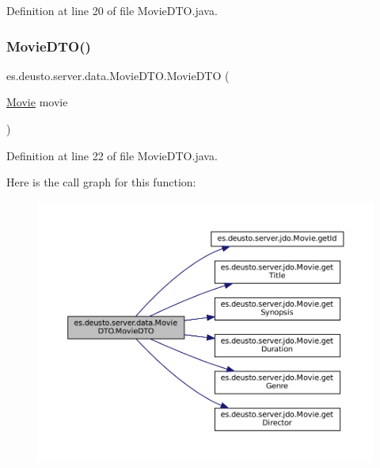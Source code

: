 Definition at line 20 of file Movie\+D\+T\+O.\+java.

\mbox{\label{classes_1_1deusto_1_1server_1_1data_1_1_movie_d_t_o_ad09b9cd627c8906f7ab7fe86d09b9e75}} 
\subsubsection{\texorpdfstring{MovieDTO()}{MovieDTO()}\hspace{0.1cm}{\footnotesize\ttfamily [2/2]}}
{\footnotesize\ttfamily es.\+deusto.\+server.\+data.\+Movie\+D\+T\+O.\+Movie\+D\+TO (\begin{DoxyParamCaption}\item[{\mbox{\hyperlink{classes_1_1deusto_1_1server_1_1jdo_1_1_movie}{Movie}}}]{movie }\end{DoxyParamCaption})}



Definition at line 22 of file Movie\+D\+T\+O.\+java.

Here is the call graph for this function\+:\nopagebreak
\begin{figure}[H]
\begin{center}
\leavevmode
\includegraphics[width=350pt]{classes_1_1deusto_1_1server_1_1data_1_1_movie_d_t_o_ad09b9cd627c8906f7ab7fe86d09b9e75_cgraph}
\end{center}
\end{figure}


